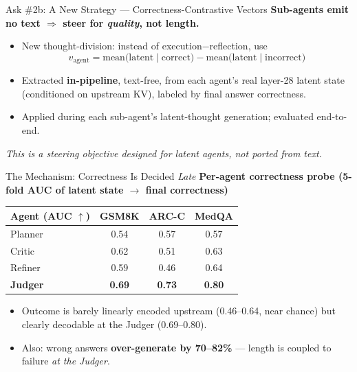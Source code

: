\documentclass{beamer}
\begin{document}
\begin{frame}{Ask \#2b: A New Strategy --- Correctness-Contrastive Vectors}
    \textbf{Sub-agents emit no text $\Rightarrow$ steer for \emph{quality}, not length.}
    \begin{itemize}
        \item New thought-division: instead of execution$-$reflection, use
        \[ v_{\text{agent}} = \text{mean(latent} \mid \text{correct)} - \text{mean(latent} \mid \text{incorrect)} \]
        \item Extracted \textbf{in-pipeline}, text-free, from each agent's real layer-28 latent state (conditioned on upstream KV), labeled by final answer correctness.
        \item Applied during each sub-agent's latent-thought generation; evaluated end-to-end.
    \end{itemize}
    \begin{center}\textit{This is a steering objective designed for latent agents, not ported from text.}\end{center}
\end{frame}

\begin{frame}{The Mechanism: Correctness Is Decided \emph{Late}}
    \textbf{Per-agent correctness probe (5-fold AUC of latent state $\rightarrow$ final correctness)}
    \begin{table}[]
        \centering\small
        \begin{tabular}{|l|c|c|c|}
            \hline
            \textbf{Agent (AUC $\uparrow$)} & \textbf{GSM8K} & \textbf{ARC-C} & \textbf{MedQA} \\ \hline
            Planner & 0.54 & 0.57 & 0.57 \\ \hline
            Critic & 0.62 & 0.51 & 0.63 \\ \hline
            Refiner & 0.59 & 0.46 & 0.64 \\ \hline
            \textbf{Judger} & \textbf{0.69} & \textbf{0.73} & \textbf{0.80} \\ \hline
        \end{tabular}
    \end{table}
    \begin{itemize}
        \item Outcome is barely linearly encoded upstream (0.46--0.64, near chance) but clearly decodable at the Judger (0.69--0.80).
        \item Also: wrong answers \textbf{over-generate by 70--82\%} --- length is coupled to failure \emph{at the Judger}.
    \end{itemize}
\end{frame}
\end{document}
